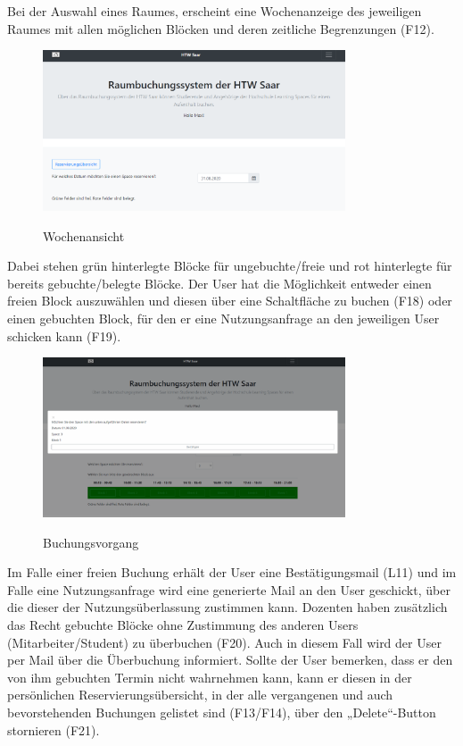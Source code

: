 \documentclass[a4paper,report,headsepline]{scrreprt}
\begin{document}
Bei der Auswahl eines Raumes, erscheint eine Wochenanzeige des jeweiligen Raumes mit allen möglichen Blöcken und deren zeitliche Begrenzungen (F12).
\begin{figure}[h]
    \centering
    \caption{Wochenansicht}
    \includegraphics[width=0.8\textwidth]{Wochenansicht}
    \label{fig:Wochenansicht}
\end{figure}
\clearpage
Dabei stehen grün hinterlegte Blöcke für ungebuchte/freie und rot hinterlegte für bereits gebuchte/belegte Blöcke. Der User hat die Möglichkeit entweder einen freien Block auszuwählen und diesen über eine Schaltfläche zu buchen (F18) oder einen gebuchten Block, für den er eine Nutzungsanfrage an den jeweiligen User schicken kann (F19).
\begin{figure}[h]
    \centering
    \caption{Buchungsvorgang}
    \includegraphics[width=0.8\textwidth]{Buchungsvorgang}
    \label{fig:Buchungsvorgang}
\end{figure}
Im Falle einer freien Buchung erhält der User eine Bestätigungsmail (L11) und im Falle eine Nutzungsanfrage wird eine generierte Mail an den User geschickt, über die dieser der Nutzungsüberlassung zustimmen kann. Dozenten haben zusätzlich das Recht gebuchte Blöcke ohne Zustimmung des anderen Users (Mitarbeiter/Student) zu überbuchen (F20). Auch in diesem Fall wird der User per Mail über die Überbuchung informiert. Sollte der User bemerken, dass er den von ihm gebuchten Termin nicht wahrnehmen kann, kann er diesen in der persönlichen Reservierungsübersicht, in der alle vergangenen und auch bevorstehenden Buchungen gelistet sind (F13/F14), über den „Delete“-Button stornieren (F21).
\end{document}
